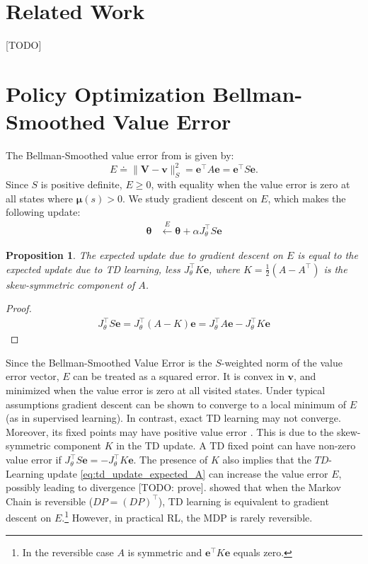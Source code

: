 \documentclass{article}
\theoremstyle{plain}
\newtheorem{proposition}[theorem]{Proposition}
\theoremstyle{definition}
\theoremstyle{remark}
\begin{document}
\section{Related Work}
[TODO]
\section{Policy Optimization Bellman-Smoothed Value Error}
The Bellman-Smoothed value error from \cite{tang2023towards} is given by:
\begin{equation}
  E \doteq  \|\bm{V} - \bm{v}\|_S^2 = \bm{e}^\intercal A \bm{e} = \bm{e}^\intercal S \bm{e}. \label{eq:E}
\end{equation}
Since $S$ is positive definite, $E \geq 0$, with equality when the value error is zero at all states where $\bm{\mu}(s) >0$. We study gradient descent on $E$, which makes the following update:
\begin{align}
  \bm{\theta} &\xleftarrow{E} \bm{\theta} + \alpha  J_\theta^\intercal S \bm{e} \label{eq:E_update_expected} 
\end{align}
\begin{proposition} \label{prop:td_vs_E_update}
  The expected update due to gradient descent on $E$ is equal to the expected update due to TD learning, less $J_\theta^\intercal K \bm{e}$, where $K = \frac{1}{2}(A - A^\intercal)$ is the skew-symmetric component of $A$.
\end{proposition}
\begin{proof}
  \begin{align}
    J_\theta^\intercal S \bm{e} =  J_\theta^\intercal (A-K) \bm{e} = J_\theta^\intercal A\bm{e} - J_\theta^\intercal K \bm{e}
  \end{align}
\end{proof}

Since the Bellman-Smoothed Value Error is the $S$-weighted norm of the value error vector, $E$ can be treated as a squared error. It is convex in $\bm{v}$, and minimized when the value error is zero at all visited states. Under typical assumptions gradient descent can be shown to converge to a local minimum of $E$ (as in supervised learning). In contrast, exact TD learning may not converge. Moreover, its fixed points may have positive value error \cite{Tsitsiklis1997Analysis}. This is due to the skew-symmetric component $K$ in the TD update. A TD fixed point can have non-zero value error if $J_\theta^\intercal S \bm{e} = - J_\theta^\intercal K \bm{e}$.  The presence of $K$ also implies that the $TD$-Learning update \eqref{eq:td_update_expected_A} can increase the value error $E$, possibly leading to divergence [TODO: prove]. \citep{tang2023towards} showed that when the Markov Chain is reversible ($DP = (DP)^\intercal$), TD learning is equivalent to gradient descent on $E$.\footnote{In the reversible case $A$ is symmetric and $\bm{e}^\intercal K \bm{e}$ equals zero.} However, in practical RL, the MDP is rarely reversible.
\end{document}
